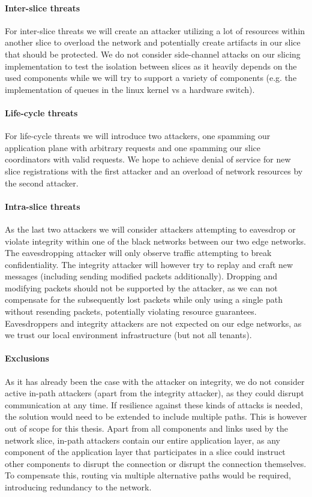 \paragraph{Inter-slice threats} For inter-slice threats we will create an attacker utilizing a lot of resources within another slice to overload the network and potentially create artifacts in our slice that should be protected. We do not consider side-channel attacks on our slicing implementation to test the isolation between slices as it heavily depends on the used components while we will try to support a variety of components (e.g. the implementation of queues in the linux kernel vs a hardware switch).

\paragraph{Life-cycle threats} For life-cycle threats we will introduce two attackers, one spamming our application plane with arbitrary requests and one spamming our slice coordinators with valid requests. We hope to achieve denial of service for new slice registrations with the first attacker and an overload of network resources by the second attacker.

\paragraph{Intra-slice threats} As the last two attackers we will consider attackers attempting to eavesdrop or violate integrity within one of the black networks between our two edge networks. The eavesdropping attacker will only observe traffic attempting to break confidentiality. The integrity attacker will however try to replay and craft new messages (including sending modified packets additionally). Dropping and modifying packets should not be supported by the attacker, as we can not compensate for the subsequently lost packets while only using a single path without resending packets, potentially violating resource guarantees. Eavesdroppers and integrity attackers are not expected on our edge networks, as we trust our local environment infrastructure (but not all tenants).

\paragraph{Exclusions} As it has already been the case with the attacker on integrity, we do not consider active in-path attackers (apart from the integrity attacker), as they could disrupt communication at any time. If resilience against these kinds of attacks is needed, the solution would need to be extended to include multiple paths. This is however out of scope for this thesis. Apart from all components and links used by the network slice, in-path attackers contain our entire application layer, as any component of the application layer that participates in a slice could instruct other components to disrupt the connection or disrupt the connection themselves. To compensate this, routing via multiple alternative paths would be required, introducing redundancy to the network.

